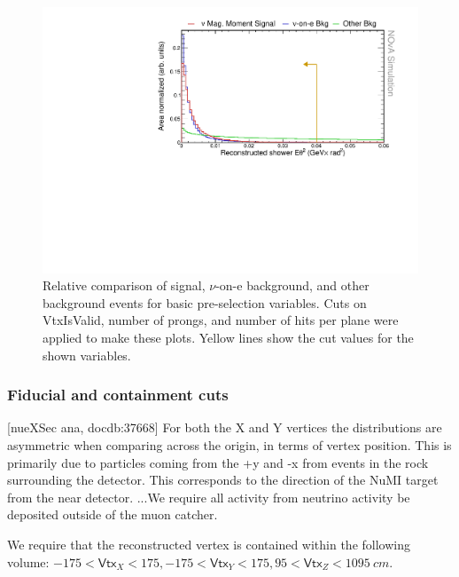 \begin{figure}[hbtp]
\centering
\includegraphics[width=.9\textwidth]{Plots/NuMMEventSelection/N1Cut_eth2Loose.pdf}
\caption{Relative comparison of signal, $\nu$-on-e background, and other background events for basic pre-selection variables. Cuts on VtxIsValid, number of prongs, and number of hits per plane were applied to make these plots. Yellow lines show the cut values for the shown variables.}
\label{fig:PreSelectionCuts2}
\end{figure}


\subsubsection*{Fiducial and containment cuts}

[nueXSec ana, docdb:37668] For both the X and Y vertices the distributions are asymmetric when comparing across the origin, in terms of vertex position. This is primarily due to particles coming from the +y and -x from events in the rock surrounding the detector. This corresponds to the direction of the NuMI target from the near detector. ...We require all activity from neutrino activity be deposited outside of the muon catcher.

We require that the reconstructed vertex is contained within the following volume: $-175<\textsf{Vtx}_X<175,-175<\textsf{Vtx}_Y<175, 95<\textsf{Vtx}_Z<1095\ \unit{cm}$.

